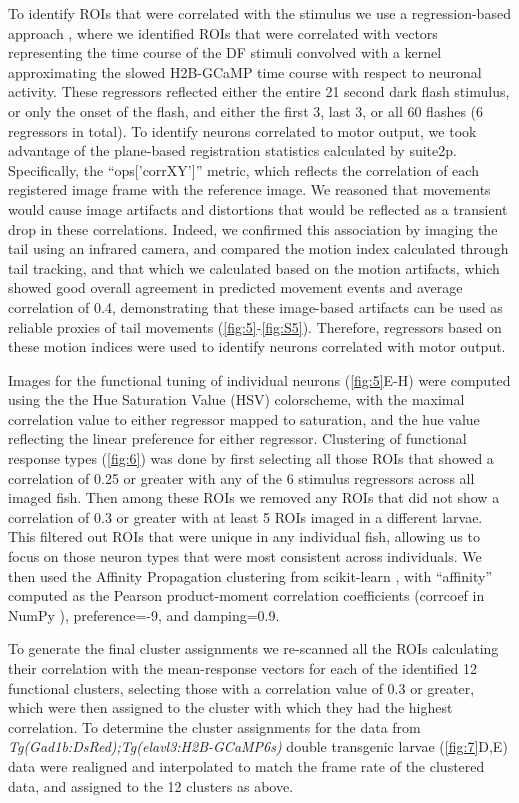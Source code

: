 \documentclass[9pt,lineno]{RandlettLab_elife}
\begin{document}
To identify ROIs that were correlated with the stimulus we use a regression-based approach \cite{Miri2011-nl}, where we identified ROIs that were correlated with vectors representing the time course of the DF stimuli convolved with a kernel approximating the slowed H2B-GCaMP time course with respect to neuronal activity. These regressors reflected either the entire 21 second dark flash stimulus, or only the onset of the flash, and either the first 3, last 3, or all 60 flashes (6 regressors in total). To identify neurons correlated to motor output, we took advantage of the plane-based registration statistics calculated by suite2p. Specifically, the “ops['corrXY']” metric, which reflects the correlation of each registered image frame with the reference image. We reasoned that movements would cause image artifacts and distortions that would be reflected as a transient drop in these correlations. Indeed, we confirmed this association by imaging the tail using an infrared camera, and compared the motion index calculated through tail tracking, and that which we calculated based on the motion artifacts, which showed good overall agreement in predicted movement events and average correlation of 0.4, demonstrating that these image-based artifacts can be used as reliable proxies of tail movements (\autoref{fig:5}-\autoref{fig:S5}). Therefore, regressors based on these motion indices were used to identify neurons correlated with motor output. 

Images for the functional tuning of individual neurons (\autoref{fig:5}E-H) were computed using the the Hue Saturation Value (HSV) colorscheme, with the maximal correlation value to either regressor mapped to saturation, and the hue value reflecting the linear preference for either regressor. Clustering of functional response types (\autoref{fig:6}) was done by first selecting all those ROIs that showed a correlation of 0.25 or greater with any of the 6 stimulus regressors across all imaged fish. Then among these ROIs we removed any ROIs that did not show a correlation of 0.3 or greater with at least 5 ROIs imaged in a different larvae. This filtered out ROIs that were unique in any individual fish, allowing us to focus on those neuron types that were most consistent across individuals. We then used the Affinity Propagation clustering from scikit-learn \cite{Pedregosa2011-dj}, with “affinity” computed as the Pearson product-moment correlation coefficients (corrcoef in NumPy \cite{Harris2020-bg}), preference=-9, and damping=0.9. 

To generate the final cluster assignments we re-scanned all the ROIs calculating their correlation with the mean-response vectors for each of the identified 12 functional clusters, selecting those with a correlation value of 0.3 or greater, which were then assigned to the cluster with which they had the highest correlation. To determine the cluster assignments for the data from \emph{Tg(Gad1b:DsRed);Tg(elavl3:H2B-GCaMP6s)} double transgenic larvae (\autoref{fig:7}D,E) data were realigned and interpolated to match the frame rate of the clustered data, and assigned to the 12 clusters as above. 
\end{document}
